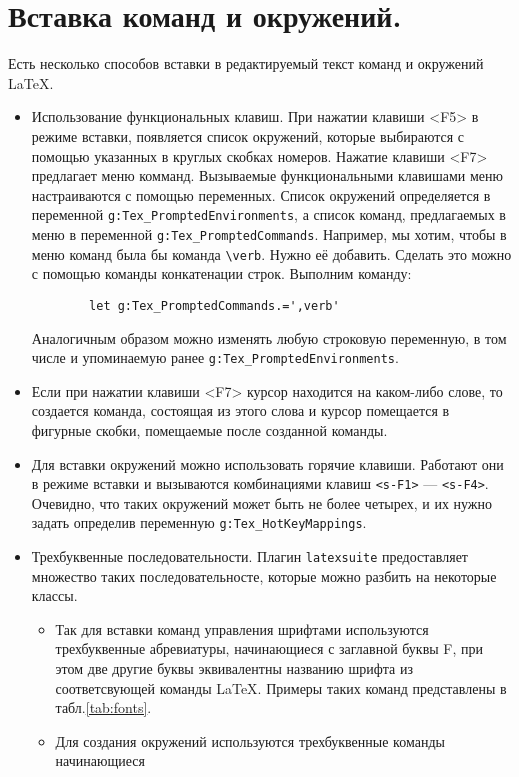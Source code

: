 \documentclass[a4paper]{article}
\begin{document}
\part{Вставка команд и окружений.}\label{part:insert}
Есть несколько способов вставки в редактируемый текст команд и окружений \LaTeX.
\begin{itemize}
	\item\sloppy Использование функциональных клавиш. При нажатии клавиши <F5> в режиме
		вставки, появляется список окружений, которые выбираются с помощью 
		указанных в круглых скобках номеров. Нажатие клавиши <F7> предлагает 
		меню комманд. Вызываемые функциональными клавишами меню настраиваются с
		помощью переменных. Список окружений определяется в переменной \verb|g:Tex_PromptedEnvironments|,
		а список команд, предлагаемых в меню в переменной 
		\verb|g:Tex_PromptedCommands|. 
		Например, мы хотим, чтобы в меню команд была бы команда \verb|\verb|. Нужно её добавить. Сделать
		это можно с помощью команды конкатенации строк. Выполним команду:
		\begin{verbatim}
		let g:Tex_PromptedCommands.=',verb'
		\end{verbatim}
		Аналогичным образом можно изменять любую строковую переменную, в том числе и упоминаемую ранее
		\verb|g:Tex_PromptedEnvironments|.
	\item Если при нажатии клавиши <F7> курсор находится на каком-либо слове, 
		то создается команда, состоящая из этого слова и курсор помещается в
		фигурные скобки, помещаемые после созданной команды. 
	\item Для вставки окружений можно использовать горячие клавиши. Работают они 
		в режиме вставки и вызываются комбинациями клавиш \texttt{<s-F1>} --- \texttt{<s-F4>}.
		Очевидно, что таких окружений может быть не более четырех, и их нужно 
		задать определив переменную \verb|g:Tex_HotKeyMappings|.
	\item Трехбуквенные последовательности. Плагин \texttt{latexsuite} предоставляет
		множество таких последовательносте, которые можно разбить на некоторые классы.
		\begin{itemize}
			\item 
		Так для вставки команд управления шрифтами 
		используются трехбуквенные абревиатуры, начинающиеся с заглавной буквы F, при
		этом две другие буквы эквивалентны названию шрифта из соответсвующей команды 
		\LaTeX. Примеры таких команд представлены в табл.\ref{tab:fonts}.
			\item Для создания окружений используются трехбуквенные команды начинающиеся

\end{itemize}
\end{itemize}
\end{document}
